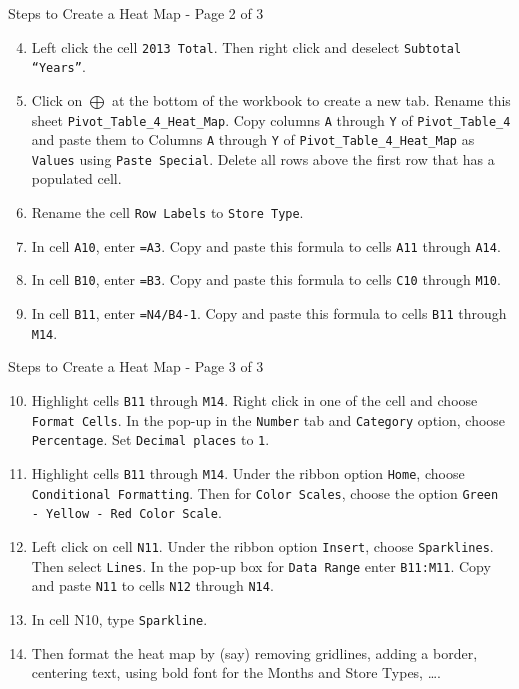 \documentclass[pdf]{beamer}
\theoremstyle{remark}
\theoremstyle{definition}
\begin{document}
\begin{frame}[t]{Steps to Create a Heat Map - Page 2 of 3}
\small
\begin{enumerate}
  \setcounter{enumi}{3}
\item Left click the cell \texttt{2013 Total}.  Then right click and deselect \texttt{Subtotal ``Years''}.
\item Click on \texttt{$\bigoplus$} at the bottom of the workbook to create a new tab.  Rename this sheet \texttt{Pivot\_Table\_4\_Heat\_Map}.  Copy columns \texttt{A} through \texttt{Y} of \texttt{Pivot\_Table\_4} and paste them to Columns \texttt{A} through \texttt{Y} of \texttt{Pivot\_Table\_4\_Heat\_Map}  as \texttt{Values} using \texttt{Paste Special}.  Delete all rows above the first row that has a populated cell. 
\item Rename the cell \texttt{Row Labels} to \texttt{Store Type}.  
\item In cell \texttt{A10}, enter \texttt{=A3}.  Copy and paste this formula to cells \texttt{A11} through \texttt{A14}.
\item In cell \texttt{B10}, enter \texttt{=B3}.  Copy and paste this formula to cells \texttt{C10} through \texttt{M10}.
\item In cell \texttt{B11}, enter \texttt{=N4/B4-1}. Copy and paste this formula to cells \texttt{B11} through \texttt{M14}.
\end{enumerate}
\end{frame}

\begin{frame}[t]{Steps to Create a Heat Map - Page 3 of 3}
\small
\begin{enumerate}
  \setcounter{enumi}{9}
\item Highlight cells \texttt{B11} through \texttt{M14}. Right click in one of the cell and choose \texttt{Format Cells}. In the pop-up in the \texttt{Number} tab and \texttt{Category} option, choose \texttt{Percentage}.  Set \texttt{Decimal places} to \texttt{1}.
\item Highlight cells \texttt{B11} through \texttt{M14}.  Under the ribbon option \texttt{Home}, choose \texttt{Conditional Formatting}.   Then for \texttt{Color Scales}, choose the option \texttt{Green - Yellow - Red Color Scale}.
\item Left click on cell \texttt{N11}. Under the ribbon option \texttt{Insert}, choose \texttt{Sparklines}.  Then select \texttt{Lines}.  In the pop-up box for \texttt{Data Range} enter \texttt{B11:M11}.  Copy and paste \texttt{N11} to cells \texttt{N12} through \texttt{N14}.
\item In cell N10, type \texttt{Sparkline}.
\item  Then format the heat map by (say) removing gridlines, adding a border, centering text, using bold font for the Months and Store Types, \ldots. 
\end{enumerate}
\end{frame}
\end{document}
